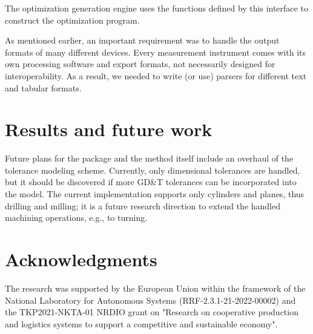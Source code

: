 \documentclass{juliacon}
\begin{document}
The optimization generation engine uses the functions defined by this interface to construct the optimization program.

As mentioned earlier, an important requirement was to handle the output formats of many different devices.
Every measurement instrument comes with its own processing software and export formats, not necessarily designed for interoperability.
As a result, we needed to write (or use) parsers for different text and tabular formats.

\section{Results and future work}
\label{sec:results}
Future plans for the package and the method itself include an overhaul of the tolerance modeling scheme.
Currently, only dimensional tolerances are handled, but it should be discovered if more GD\&T tolerances can be incorporated into the model.
The current implementation supports only cylinders and planes, thus drilling and milling; it is a future research direction to extend the handled machining operations, e.g., to turning.

\section{Acknowledgments}
The research was supported by the European Union within the framework of the National Laboratory for Autonomous Systems (RRF-2.3.1-21-2022-00002) and the TKP2021-NKTA-01  NRDIO grant on "Research on cooperative production and logistics systems to support a competitive and sustainable economy".


\end{document}
